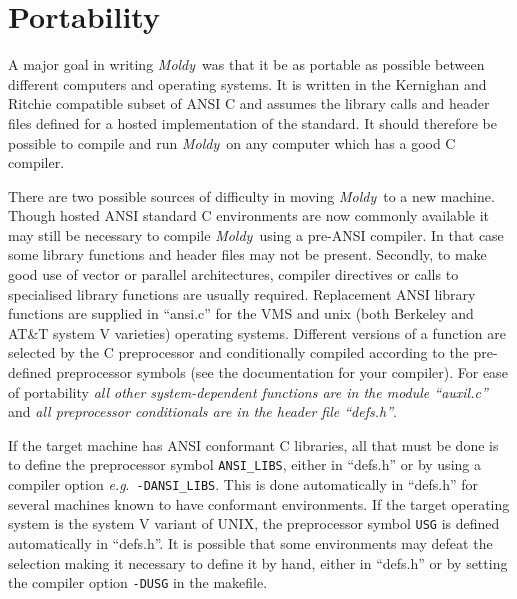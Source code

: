\documentclass[twoside]{report}
\newcommand{\moldy}{{\em Moldy}}
\begin{document}
\section{Portability}%
A major goal in writing \moldy\ was that it be as portable as possible
between different computers  and operating systems.  It is  written in
the Kernighan and Ritchie\cite{kernighan:78} compatible subset of ANSI
C and assumes the library calls and header files  defined for a hosted
implementation of the  standard.  It  should therefore be possible  to
compile and run \moldy\ on any computer which has a good C compiler.

There are two possible sources of difficulty in moving \moldy\ to a
new machine. Though hosted ANSI standard C environments are now
commonly available it may still be necessary to compile \moldy\ using
a pre-ANSI compiler.  In that case some library functions and header
files may not be present. Secondly, to make good use of vector or
parallel architectures, compiler directives or calls to specialised
library functions are usually required.  Replacement ANSI library
functions are supplied in ``ansi.c'' for the VMS and unix (both
Berkeley and AT\&T system V varieties) operating systems.  Different
versions of a function are selected by the C preprocessor and
conditionally compiled according to the pre-defined preprocessor
symbols (see the documentation for your compiler).  For ease of
portability {\em all other system-dependent functions are in the
  module ``auxil.c''\/} and {\em all preprocessor conditionals are in
  the header file ``defs.h''}.

If the target machine has ANSI conformant C libraries, all that must
be done is to define the preprocessor symbol \texttt{ANSI\_LIBS}, either
in ``defs.h'' or by using a compiler option {\em e.g}.\
\texttt{-DANSI\_LIBS}.  This is done automatically in ``defs.h'' for
several machines known to have conformant environments.  If the target
operating system is the system V variant of UNIX, the preprocessor
symbol \texttt{USG} is defined automatically in ``defs.h''.  It is
possible that some environments may defeat the selection making it
necessary to define it by hand, either in ``defs.h'' or by setting
the compiler option \texttt{-DUSG} in the makefile. 
\end{document}
